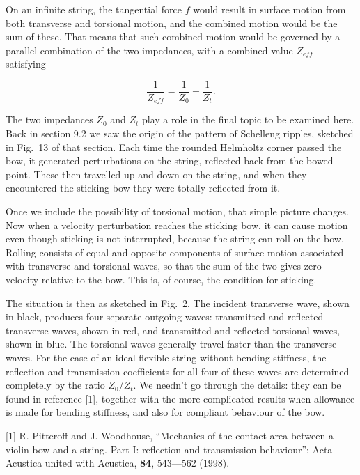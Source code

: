   On an infinite string, the tangential force $f$ would result in surface 
  motion from both transverse and torsional motion, and the combined motion 
  would be the sum of these. That means that such combined motion would be 
  governed by a parallel combination of the two impedances, with a combined 
  value $Z_{eff}$ satisfying 

  \begin{equation*}\dfrac{1}{Z_{eff}}=\dfrac{1}{Z_0}+\dfrac{1}{Z_t} . 
  \tag{13}\end{equation*} 

  The two impedances $Z_0$ and $Z_t$ play a role in the final topic to be 
  examined here. Back in section 9.2 we saw the origin of the pattern of 
  Schelleng ripples, sketched in Fig.\ 13 of that section. Each time the 
  rounded Helmholtz corner passed the bow, it generated perturbations on the 
  string, reflected back from the bowed point. These then travelled up and down 
  on the string, and when they encountered the sticking bow they were totally 
  reflected from it. 

  Once we include the possibility of torsional motion, that simple picture 
  changes. Now when a velocity perturbation reaches the sticking bow, it can 
  cause motion even though sticking is not interrupted, because the string can 
  roll on the bow. Rolling consists of equal and opposite components of surface 
  motion associated with transverse and torsional waves, so that the sum of the 
  two gives zero velocity relative to the bow. This is, of course, the 
  condition for sticking. 

  The situation is then as sketched in Fig.\ 2. The incident transverse wave, 
  shown in black, produces four separate outgoing waves: transmitted and 
  reflected transverse waves, shown in red, and transmitted and reflected 
  torsional waves, shown in blue. The torsional waves generally travel faster 
  than the transverse waves. For the case of an ideal flexible string without 
  bending stiffness, the reflection and transmission coefficients for all four 
  of these waves are determined completely by the ratio $Z_0/Z_t$. We needn't 
  go through the details: they can be found in reference [1], together with the 
  more complicated results when allowance is made for bending stiffness, and 
  also for compliant behaviour of the bow. 


  \sectionreferences{}[1] R. Pitteroff and J. Woodhouse, “Mechanics of the 
  contact area between a violin bow and a string. Part I: reflection and 
  transmission behaviour”; Acta Acustica united with Acustica, \textbf{84}, 
  543—562 (1998). 